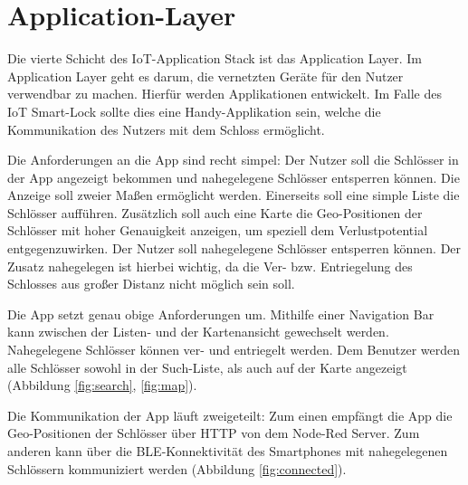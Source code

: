 
\section{Application-Layer}
Die vierte Schicht des \ac{IoT}-Application Stack ist das Application Layer. Im Application Layer geht es darum, die vernetzten Geräte für den Nutzer verwendbar zu machen. Hierfür werden Applikationen entwickelt. Im Falle des \ac{IoT} Smart-Lock sollte dies eine Handy-Applikation sein, welche die Kommunikation des Nutzers mit dem Schloss ermöglicht.

Die Anforderungen an die App sind recht simpel: Der Nutzer soll die Schlösser in der App angezeigt bekommen und nahegelegene Schlösser entsperren können. Die Anzeige soll zweier Maßen ermöglicht werden. Einerseits soll eine simple Liste die Schlösser aufführen. Zusätzlich soll auch eine Karte die Geo-Positionen der Schlösser mit hoher Genauigkeit anzeigen, um speziell dem Verlustpotential entgegenzuwirken. Der Nutzer soll nahegelegene Schlösser entsperren können. Der Zusatz nahegelegen ist hierbei wichtig, da die Ver- bzw. Entriegelung des Schlosses aus großer Distanz nicht möglich sein soll.

Die App setzt genau obige Anforderungen um. Mithilfe einer Navigation Bar kann zwischen der Listen- und der Kartenansicht gewechselt werden. Nahegelegene Schlösser können ver- und entriegelt werden. Dem Benutzer werden alle Schlösser sowohl in der Such-Liste, als auch auf der Karte angezeigt (Abbildung \ref{fig:search}, \ref{fig:map}).

Die Kommunikation der App läuft zweigeteilt: Zum einen empfängt die App die Geo-Positionen der Schlösser über \ac{HTTP} von dem Node-Red Server. Zum anderen kann über die \ac{BLE}-Konnektivität des Smartphones mit nahegelegenen Schlössern kommuniziert werden (Abbildung \ref{fig:connected}).

